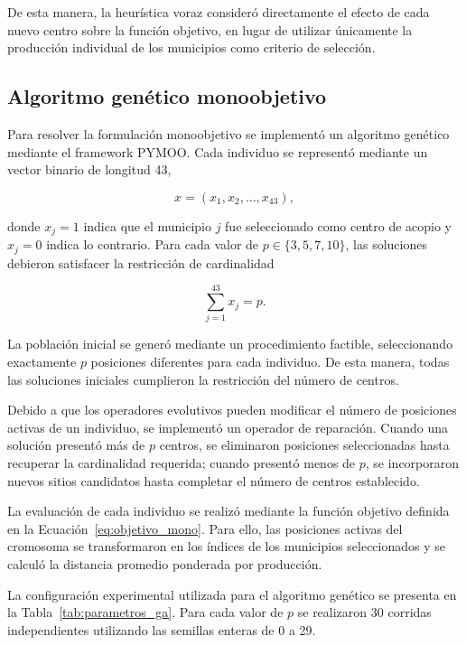 \documentclass[journal]{IEEEtran}
\begin{document}
De esta manera, la heurística voraz consideró directamente el efecto de cada nuevo centro sobre la función objetivo, en lugar de utilizar únicamente la producción individual de los municipios como criterio de selección.

\subsection{Algoritmo genético monoobjetivo}

Para resolver la formulación monoobjetivo se implementó un algoritmo genético mediante el framework PYMOO. Cada individuo se representó mediante un vector binario de longitud 43,

\begin{equation}
	x=(x_1,x_2,\ldots,x_{43}),
\end{equation}

donde $x_j=1$ indica que el municipio $j$ fue seleccionado como centro de acopio y $x_j=0$ indica lo contrario. Para cada valor de $p \in \{3,5,7,10\}$, las soluciones debieron satisfacer la restricción de cardinalidad

\begin{equation}
	\sum_{j=1}^{43}x_j=p.
\end{equation}

La población inicial se generó mediante un procedimiento factible, seleccionando exactamente $p$ posiciones diferentes para cada individuo. De esta manera, todas las soluciones iniciales cumplieron la restricción del número de centros.

Debido a que los operadores evolutivos pueden modificar el número de posiciones activas de un individuo, se implementó un operador de reparación. Cuando una solución presentó más de $p$ centros, se eliminaron posiciones seleccionadas hasta recuperar la cardinalidad requerida; cuando presentó menos de $p$, se incorporaron nuevos sitios candidatos hasta completar el número de centros establecido.

La evaluación de cada individuo se realizó mediante la función objetivo definida en la Ecuación~\ref{eq:objetivo_mono}. Para ello, las posiciones activas del cromosoma se transformaron en los índices de los municipios seleccionados y se calculó la distancia promedio ponderada por producción.

La configuración experimental utilizada para el algoritmo genético se presenta en la Tabla~\ref{tab:parametros_ga}. Para cada valor de $p$ se realizaron 30 corridas independientes utilizando las semillas enteras de 0 a 29.
\end{document}
